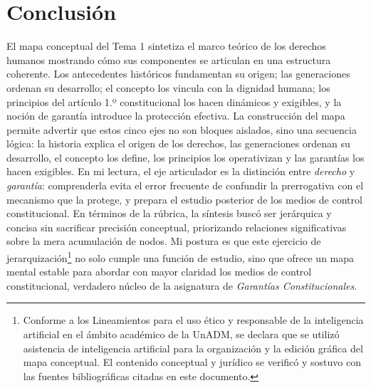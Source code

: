 ﻿\documentclass[
  spanish,
  letterpaper, oneside
]{article}
\begin{document}
\clearpage
\section{Conclusión}

El mapa conceptual del Tema 1 sintetiza el marco teórico de los derechos humanos mostrando cómo sus componentes se articulan en una estructura coherente. Los antecedentes históricos fundamentan su origen; las generaciones ordenan su desarrollo; el concepto los vincula con la dignidad humana; los principios del artículo 1.º constitucional los hacen dinámicos y exigibles, y la noción de garantía introduce la protección efectiva. La construcción del mapa permite advertir que estos cinco ejes no son bloques aislados, sino una secuencia lógica: la historia explica el origen de los derechos, las generaciones ordenan su desarrollo, el concepto los define, los principios los operativizan y las garantías los hacen exigibles. En mi lectura, el eje articulador es la distinción entre \textit{derecho} y \textit{garantía}: comprenderla evita el error frecuente de confundir la prerrogativa con el mecanismo que la protege, y prepara el estudio posterior de los medios de control constitucional. En términos de la rúbrica, la síntesis buscó ser jerárquica y concisa sin sacrificar precisión conceptual, priorizando relaciones significativas sobre la mera acumulación de nodos. Mi postura es que este ejercicio de jerarquización\footnote{Conforme a los Lineamientos para el uso ético y responsable de la inteligencia artificial en el ámbito académico de la UnADM, se declara que se utilizó asistencia de inteligencia artificial para la organización y la edición gráfica del mapa conceptual. El contenido conceptual y jurídico se verificó y sostuvo con las fuentes bibliográficas citadas en este documento.} no solo cumple una función de estudio, sino que ofrece un mapa mental estable para abordar con mayor claridad los medios de control constitucional, verdadero núcleo de la asignatura de \textit{Garantías Constitucionales}.

\clearpage
\nocite{unadmSitioWeb,cpeum2026,normasApaReferencias2020}

\end{document}
